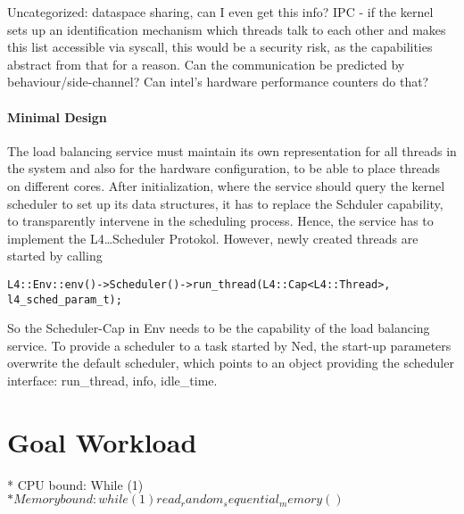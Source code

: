 Uncategorized: dataspace sharing, can I even get this info?
IPC - if the kernel sets up an identification mechanism which threads talk to
each other and makes this list accessible via syscall, this would be a security
risk, as the capabilities abstract from that for a reason.
Can the communication be predicted by behaviour/side-channel?
Can \gls{intel}'s hardware performance counters do that?

\paragraph{Minimal Design}
The load balancing service must maintain its own representation for all threads
in the system and also for the hardware configuration, to be able to place
threads on different cores.
After initialization, where the service should query the kernel scheduler to
set up its data structures, it has to replace the Schduler capability, to
transparently intervene in the scheduling process.
Hence, the service has to implement the L4\dots{}Scheduler Protokol.
However, newly created threads are started by calling
\begin{verbatim}
L4::Env::env()->Scheduler()->run_thread(L4::Cap<L4::Thread>, l4_sched_param_t);
\end{verbatim}
So the Scheduler-Cap in Env needs to be the capability of the load balancing
service.
To provide a scheduler to a task started by Ned, the start-up parameters
overwrite the default scheduler, which points
to an object providing the scheduler interface: run\_thread, info, idle\_time.








\section{Goal Workload}

* CPU bound: While (1)
$* Memory bound: while (1) read_random_sequential_memory ()$


\cleardoublepage


